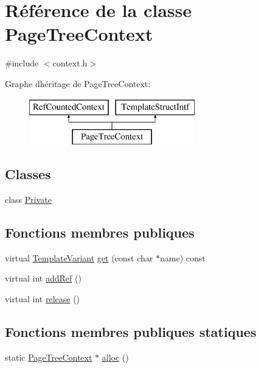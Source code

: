 \hypertarget{class_page_tree_context}{}\section{Référence de la classe Page\+Tree\+Context}
\label{class_page_tree_context}


{\ttfamily \#include $<$context.\+h$>$}

Graphe d\textquotesingle{}héritage de Page\+Tree\+Context\+:\begin{figure}[H]
\begin{center}
\leavevmode
\includegraphics[height=2.000000cm]{class_page_tree_context}
\end{center}
\end{figure}
\subsection*{Classes}
\begin{DoxyCompactItemize}
\item 
class \hyperlink{class_page_tree_context_1_1_private}{Private}
\end{DoxyCompactItemize}
\subsection*{Fonctions membres publiques}
\begin{DoxyCompactItemize}
\item 
virtual \hyperlink{class_template_variant}{Template\+Variant} \hyperlink{class_page_tree_context_a267ded8ccdd6e26ce507cc6cba57b132}{get} (const char $\ast$name) const 
\item 
virtual int \hyperlink{class_page_tree_context_ab0c3eb857f63c20d9bbc8b65223d052c}{add\+Ref} ()
\item 
virtual int \hyperlink{class_page_tree_context_ae55145312b83e56e57c3e59311d788c2}{release} ()
\end{DoxyCompactItemize}
\subsection*{Fonctions membres publiques statiques}
\begin{DoxyCompactItemize}
\item 
static \hyperlink{class_page_tree_context}{Page\+Tree\+Context} $\ast$ \hyperlink{class_page_tree_context_a534c4a9aefb623cfdbe9bb9e61f92195}{alloc} ()
\end{DoxyCompactItemize}


